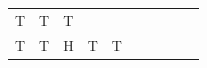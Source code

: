 {\begin{tabular}[t]{|l|l|l|l|l|l|l|l|l|l|}
    
        T &
    
    
        T &
    
    
        T%
     \tabularnewline\cline{1-1}\cline{2-2}\cline{3-3}\cline{4-4}\cline{5-5}\cline{6-6}\cline{7-7}\cline{8-8}\cline{9-9}\cline{10-10}
    
    
        T &
    
    
        T &
    
    
        H &
    
    
        T &
    
    
        T &
    
    

\end{tabular}}
